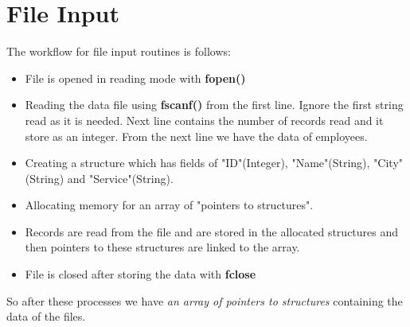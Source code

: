 
\chapter{File Input} %
\label{Chapter2}
The workflow for file input routines is follows:
\begin{itemize}
	\item File is opened in reading mode with \textbf{fopen()}
	\item Reading the data file using \textbf{fscanf()} from the first line. Ignore the first string read as it is needed. Next line contains the number of records read and it store as an integer. From the next line we have the data of employees.
	\item Creating a structure which has fields of "ID"(Integer), "Name"(String), "City"(String) and "Service"(String).
	\item Allocating memory for an array of "pointers to structures".
	\item Records are read from the file and are stored in the allocated structures and then pointers to these structures are linked to the array.
	\item File is closed after storing the data with \textbf{fclose}
\end{itemize}

So after these processes we have \textit{an array of pointers to structures} containing the data of the files.